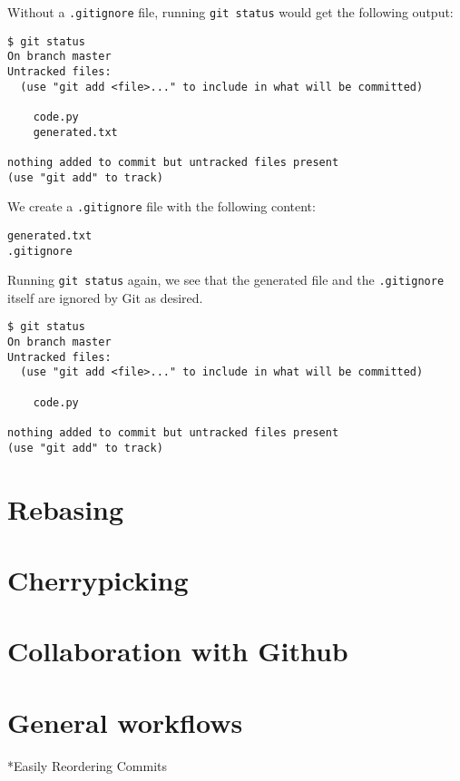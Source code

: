 \documentclass{amsart}
\makeatletter
\renewcommand\subsection{\@startsection{subsection}{2}%
  \z@{-.5\linespacing\@plus-.7\linespacing}{.5\linespacing}%
  {\normalfont\scshape}}
\makeatother
\begin{document}
Without a \texttt{.gitignore} file, running \texttt{git status} would get the following output:

\begin{verbatim}
$ git status
On branch master
Untracked files:
  (use "git add <file>..." to include in what will be committed)
  
    code.py
    generated.txt

nothing added to commit but untracked files present
(use "git add" to track)
\end{verbatim}

We create a \texttt{.gitignore} file with the following content:

\begin{verbatim}
generated.txt
.gitignore
\end{verbatim}

Running \texttt{git status} again, we see that the generated file and the \texttt{.gitignore} itself are ignored by Git as desired.

\begin{verbatim}
$ git status
On branch master
Untracked files:
  (use "git add <file>..." to include in what will be committed)
  
    code.py

nothing added to commit but untracked files present
(use "git add" to track)
\end{verbatim}

\newpage
\section*{Rebasing}

\section*{Cherrypicking}

\section*{Collaboration with Github}

\section*{General workflows}

\subsection*{Easily Reordering Commits}
\end{document}
